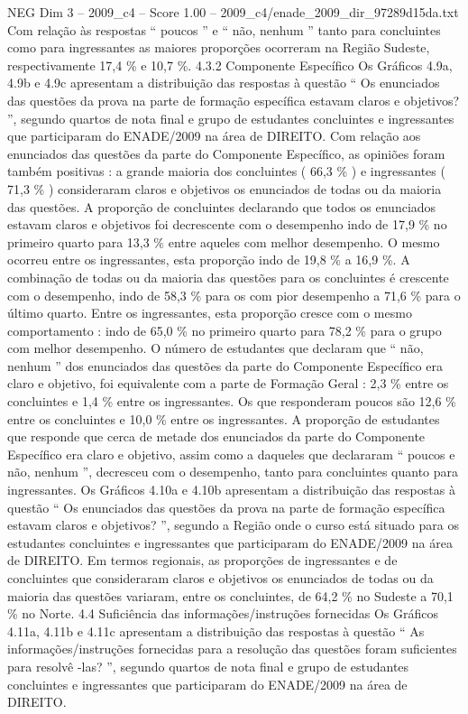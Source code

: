 \begin{textsample}{NEG Dim 3 – 2009\_c4 – Score 1.00 – 2009\_c4/enade\_2009\_dir\_97289d15da.txt}
Com relação às respostas “ poucos ” e “ não, nenhum ” tanto para concluintes como para ingressantes as maiores proporções ocorreram na Região Sudeste, respectivamente 17,4 \% e 10,7 \%. 4.3.2 Componente Específico Os Gráficos 4.9a, 4.9b e 4.9c apresentam a distribuição das respostas à questão “ Os enunciados das questões da prova na parte de formação específica estavam claros e objetivos? ”, segundo quartos de nota final e grupo de estudantes concluintes e ingressantes que participaram do ENADE/2009 na área de DIREITO.
Com relação aos enunciados das questões da parte do Componente Específico, as opiniões foram também positivas : a grande maioria dos concluintes ( 66,3 \% ) e ingressantes ( 71,3 \% ) consideraram claros e objetivos os enunciados de todas ou da maioria das questões.
A proporção de concluintes declarando que todos os enunciados estavam claros e objetivos foi decrescente com o desempenho indo de 17,9 \% no primeiro quarto para 13,3 \% entre aqueles com melhor desempenho.
O mesmo ocorreu entre os ingressantes, esta proporção indo de 19,8 \% a 16,9 \%.
A combinação de todas ou da maioria das questões para os concluintes é crescente com o desempenho, indo de 58,3 \% para os com pior desempenho a 71,6 \% para o último quarto.
Entre os ingressantes, esta proporção cresce com o mesmo comportamento : indo de 65,0 \% no primeiro quarto para 78,2 \% para o grupo com melhor desempenho.
O número de estudantes que declaram que “ não, nenhum ” dos enunciados das questões da parte do Componente Específico era claro e objetivo, foi equivalente com a parte de Formação Geral : 2,3 \% entre os concluintes e 1,4 \% entre os ingressantes.
Os que responderam poucos são 12,6 \% entre os concluintes e 10,0 \% entre os ingressantes.
A proporção de estudantes que responde que cerca de metade dos enunciados da parte do Componente Específico era claro e objetivo, assim como a daqueles que declararam “ poucos e não, nenhum ”, decresceu com o desempenho, tanto para concluintes quanto para ingressantes.
Os Gráficos 4.10a e 4.10b apresentam a distribuição das respostas à questão “ Os enunciados das questões da prova na parte de formação específica estavam claros e objetivos? ”, segundo a Região onde o curso está situado para os estudantes concluintes e ingressantes que participaram do ENADE/2009 na área de DIREITO.
Em termos regionais, as proporções de ingressantes e de concluintes que consideraram claros e objetivos os enunciados de todas ou da maioria das questões variaram, entre os concluintes, de 64,2 \% no Sudeste a 70,1 \% no Norte. 4.4 Suficiência das informações/instruções fornecidas Os Gráficos 4.11a, 4.11b e 4.11c apresentam a distribuição das respostas à questão “ As informações/instruções fornecidas para a resolução das questões foram suficientes para resolvê -las? ”, segundo quartos de nota final e grupo de estudantes concluintes e ingressantes que participaram do ENADE/2009 na área de DIREITO.

\end{textsample}

